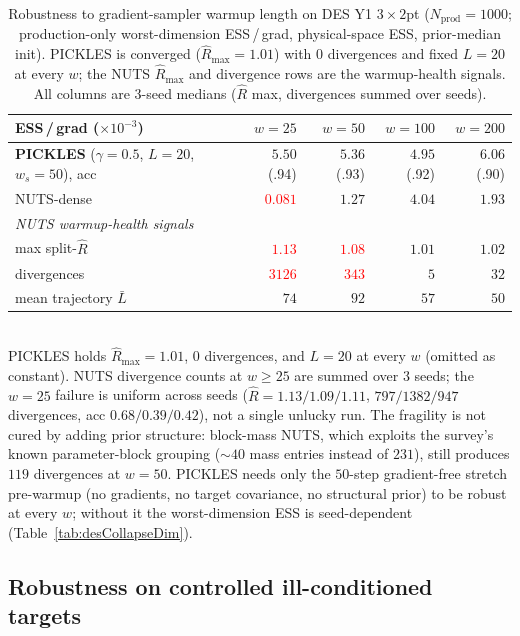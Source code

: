 \documentclass{article}
\begin{document}
\begin{table}[t]
\centering
\caption{Robustness to gradient-sampler warmup length on DES Y1
$3\times 2$pt ($N_{\text{prod}}=1000$; production-only worst-dimension
ESS\,/\,grad, physical-space ESS, prior-median init). PICKLES is
converged ($\hat R_{\max}=1.01$) with $0$ divergences and fixed $L=20$ at
every $w$; the NUTS $\hat R_{\max}$ and divergence rows are the
warmup-health signals. All columns are $3$-seed medians ($\hat R$ max,
divergences summed over seeds).}
\label{tab:desWarmupSweep}
\small
\begin{tabular}{l rrrr}
\toprule
ESS\,/\,grad ($\times10^{-3}$) & $w{=}25$ & $w{=}50$ & $w{=}100$ & $w{=}200$ \\
\midrule
\textbf{PICKLES} ($\gamma{=}0.5$, $L{=}20$, $w_s{=}50$), acc
   & $\mathbf{5.50}$ (.94) & $\mathbf{5.36}$ (.93)
   & $\mathbf{4.95}$ (.92) & $\mathbf{6.06}$ (.90)\\
NUTS-dense
   & \textcolor{red}{$0.081$} & $1.27$ & $4.04$ & $1.93$\\
\midrule
\multicolumn{5}{l}{\emph{NUTS warmup-health signals}}\\
\quad max split-$\hat R$
   & \textcolor{red}{$1.13$} & \textcolor{red}{$1.08$} & $1.01$ & $1.02$\\
\quad divergences
   & \textcolor{red}{$3126$} & \textcolor{red}{$343$} & $5$ & $32$\\
\quad mean trajectory $\bar L$
   & $74$ & $92$ & $57$ & $50$\\
\bottomrule
\end{tabular}
\\[2pt]
\footnotesize
PICKLES holds $\hat R_{\max}=1.01$, $0$ divergences, and $L=20$ at every
$w$ (omitted as constant). NUTS divergence counts at $w\!\ge\!25$ are
summed over $3$ seeds; the $w=25$ failure is uniform across seeds
($\hat R=1.13/1.09/1.11$, $797/1382/947$ divergences, acc $0.68/0.39/0.42$),
not a single unlucky run. The fragility is
not cured by adding prior structure: block-mass NUTS, which exploits the
survey's known parameter-block grouping ($\sim\!40$ mass entries instead
of $231$), still produces $119$ divergences at $w=50$. PICKLES needs only
the $50$-step gradient-free stretch pre-warmup (no gradients, no target
covariance, no structural prior) to be robust at every $w$; without it
the worst-dimension ESS is seed-dependent
(Table~\ref{tab:desCollapseDim}).
\end{table}

\clearpage
\subsection{Robustness on controlled ill-conditioned targets}
\label{ssec:warmupRobust}
\end{document}
